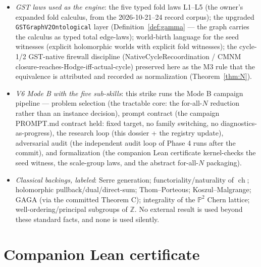 \documentclass[11pt]{article}
\newcommand{\ch}{\operatorname{ch}}
\newcommand{\Z}{\mathbb{Z}}
\newcommand{\Pp}{\mathbb{P}}
\begin{document}
\begin{itemize}
\item \emph{GST laws used as the engine}: the five typed fold laws L1--L5
(the owner's expanded fold calculus, from the 2026-10-21--24 record corpus);
the upgraded \texttt{GSTGraphV2Ontological} layer (Definition~\ref{def:gamma}
--- the graph carries the calculus as typed total edge-laws); world-birth
language for the seed witnesses (explicit holomorphic worlds with explicit
fold witnesses); the cycle-1/2 GST-native firewall discipline
(NativeCycleRecoordination / CMNM closure-reaches-Hodge-iff-actual-cycle)
preserved here as the M3 rule that the equivalence is attributed and recorded
as normalization (Theorem~\ref{thm:N}).
\item \emph{V6 Mode B with the five sub-skills}: this strike runs the Mode B
campaign pipeline --- problem selection (the tractable core: the for-all-$N$
reduction rather than an instance decision), prompt contract (the campaign
PROMPT.md contract held: fixed target, no family switching, no
diagnostics-as-progress), the research loop (this dossier + the registry
update), adversarial audit (the independent audit loop of Phase 4 runs after
the commit), and formalization (the companion Lean certificate
kernel-checks the seed witness, the scale-group laws, and the abstract
for-all-$N$ packaging).
\item \emph{Classical backings, labeled}: Serre generation;
functoriality/naturality of $\ch$; holomorphic pullback/dual/direct-sum;
Thom--Porteous; Koszul--Malgrange; GAGA (via the committed Theorem C);
integrality of the $\Pp^2$ Chern lattice; well-ordering/principal subgroups
of $\Z$.  No external result is used beyond these standard facts, and none
is used silently.
\end{itemize}

\section{Companion Lean certificate}
\label{sec:lean}
\end{document}

